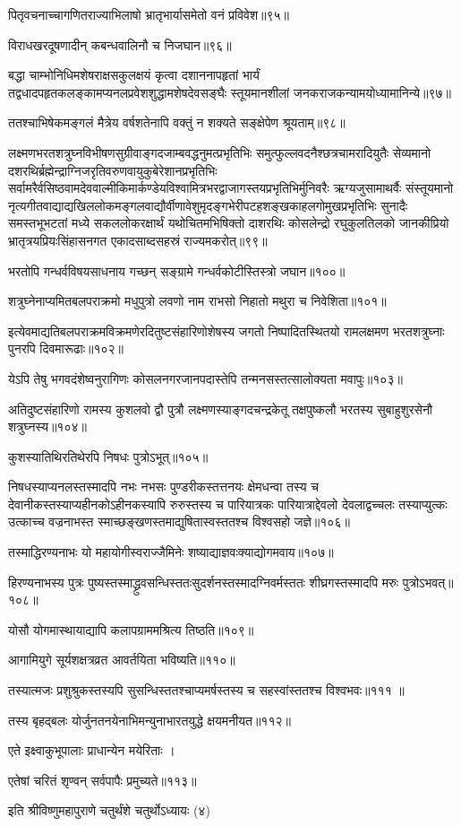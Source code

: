 पितृवचनाच्चागणितराज्याभिलाषो भ्रातृभार्यासमेतो वनं प्रविवेश॥९५॥

विराधखरदूषणादीन् कबन्धवालिनौ च निजघान॥९६॥

बद्धा चाम्भोनिधिमशेषराक्षसकुलक्षयं कृत्वा दशाननापहृतां भार्यं
तद्वधादपहृतकलङ्कामप्यनलप्रवेशशुद्धामशेषदेवसङ्घैः स्तूयमानशीलां जनकराजकन्यामयोध्यामानिन्ये॥९७॥

ततश्चाभिषेकमङ्गलं मैत्रेय वर्षशतेनापि वक्तुं न शक्यते सङ्क्षेपेण श्रूयताम्॥९८॥

लक्ष्मणभरतशत्रुघ्नविभीषणसुग्रीवाङ्गदजाम्बवद्धनुमत्प्रभृतिभिः समुत्फुल्लवदनैश्छत्रचामरादियुतैः
सेव्यमानो दशरथिर्ब्रह्मेन्द्राग्निजरृतिवरुणवायुकुबेरेशानप्रभृतिभिः
सर्वामरैर्वसिष्ठवामदेववाल्मीकिमार्कण्डेयविश्वामित्रभरद्वाजागस्तयप्रभृतिभिर्मुनिवरैः
ऋग्यजुसामाथर्वैः संस्तूयमानो
नृत्यगीतवाद्याद्यखिललोकमङ्गलवाद्यौर्वीणावेशुमृदङ्गभेरीपटहशङ्खकाहलगोमुखप्रभृतिभिः सुनादैः
समस्तभूभटतां मध्ये सकललोकरक्षार्थं यथोचितमभिषिक्तो दाशरथिः कोसलेन्द्रो रघुकुलतिलको
जानकीप्रियो भ्रातृत्रयप्रियःसिंहासनगत एकादसाब्दसहस्रं राज्यमकरोत्॥९९॥

भरतोपि गन्धर्वविषयसाधनाय गच्छन् सङ्ग्रामे गन्धर्वकोटीस्तिस्त्रो जघान॥१००॥

शत्रुघ्नेनाप्यमितबलपराक्रमो मधुपुत्रो लवणो नाम राभसो निहातो मथुरा च निवेशिता॥१०१॥

इत्येवमाद्यतिबलपराक्रमविक्रमणेरदितुष्टसंहारिणोशेषस्य जगतो निष्पादितस्थितयो रामलक्षमण
भरतशत्रुघ्नाः पुनरपि दिवमारूढाः॥१०२॥

येऽपि तेषु भगवदंशेष्वनुरागिणः कोसलनगरजानपदास्तेपि तन्मनसस्तत्सालोक्यता मवापुः॥१०३॥

अतिदुष्टसंहारिणो रामस्य कुशलवो द्वौ पुत्रौ लक्ष्मणस्याङ्गदचन्द्रकेतू तक्षपुष्कलौ भरतस्य
सुबाहुशुरसेनौ शत्रुघ्नस्य॥१०४॥

कुशस्यातिथिरतिथेरपि निषधः पुत्रोऽभूत्॥१०५॥

निषधस्याप्यनलस्तस्मादपि नभः नभसः पुण्डरीकस्तत्तनयः क्षेमधन्वा तस्य च
देवानीकस्तस्याप्यहीनकोऽहीनकस्यापि रुरुस्तस्य च पारियात्रकः पारियात्राद्देवलो
देवलाद्वच्चलः तस्याप्युत्कः उत्काच्च वज्रनाभस्त स्माच्छङ्खणस्तमाद्युषितास्वस्ततश्च विश्वसहो
जज्ञे॥१०६॥

तस्माद्धिरण्यनाभः यो महायोगीस्वराज्जैमिनेः शष्याद्याज्ञवःक्याद्योगमवाय॥१०७॥

हिरण्यनाभस्य पुत्रः पुष्यस्तस्माद्ध्रुवसन्धिस्ततःसुदर्शनस्तस्मादग्निवर्मस्ततः शीघ्रगस्तस्मादपि
मरुः पुत्रोऽभवत्॥१०८॥

योसौ योगमास्थायाद्यापि कलापग्राममश्रित्य तिष्ठति॥१०९॥

आगामियुगे सूर्यशक्षत्रव्रत आवर्तयिता भविष्यति॥११०॥

तस्यात्मजः प्रशुश्रुकस्तस्यपि सुसन्धिस्ततश्चाप्यमर्षस्तस्य च सहस्वांस्ततश्च विश्वभवः॥१११
॥

तस्य बृहद्बलः योर्जुनतनयेनाभिमन्युनाभारतयुद्धे क्षयमनीयत॥११२॥

एते इक्ष्वाकुभूपालाः प्राधान्येन मयेरिताः ।

एतेषां चरितं शृण्वन् सर्वपापैः प्रमुच्यते॥११३॥

इति श्रीविष्णुमहापुराणे चतुर्थंशे चतुर्थोऽध्यायः (४)